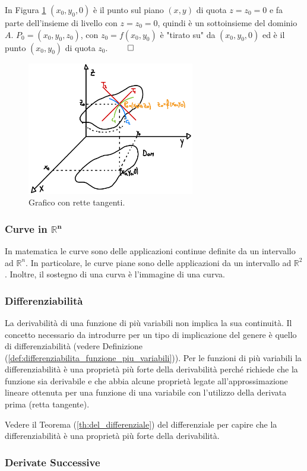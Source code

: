 In Figura \ref{fig:grafico_f_R3_osservazione} $(x_0,y_0,0)$ è il punto sul piano $(x,y)$ di quota $z=z_0=0$ e fa parte dell'insieme di livello con $z=z_0=0$, quindi è un sottoinsieme del dominio $A$. $P_0=(x_0,y_0,z_0)$, con $z_0=f(x_0,y_0)$ è "tirato su" da $(x_0,y_0,0)$ ed è il punto $(x_0,y_0)$ di quota $z_0$. $\qed$
\begin{figure}[ht]
    \centering
    \includegraphics[width=0.65\textwidth]{Analisi2/figures/grafico_f_R3_osservazione.png}
    \caption{Grafico con rette tangenti.}\label{fig:grafico_f_R3_osservazione}
\end{figure}

\subsubsection{Curve in \texorpdfstring{$\boldsymbol{\mathbb R^n}$}{Rn}}\label{ssec:curve_Rn}
In matematica le curve sono delle applicazioni continue definite da un intervallo ad $\mathbb R^n$. In particolare, le curve piane sono delle applicazioni da un intervallo ad $\mathbb R^2$. Inoltre, il sostegno di una curva è l'immagine di una curva.

\subsubsection{Differenziabilità}
La derivabilità di una funzione di più variabili non implica la sua continuità. Il concetto necessario da introdurre per un tipo di implicazione del genere è quello di differenziabilità (vedere Definizione (\ref{def:differenziabilita_funzione_piu_variabili})). Per le funzioni di più variabili la differenziabilità è una proprietà più forte della derivabilità perché richiede che la funzione sia derivabile e che abbia alcune proprietà legate all'approssimazione lineare ottenuta per una funzione di una variabile con l'utilizzo della derivata prima (retta tangente).

Vedere il Teorema (\ref{th:del_differenziale}) del differenziale per capire che la differenziabilità è una proprietà più forte della derivabilità.

\subsubsection{Derivate Successive}